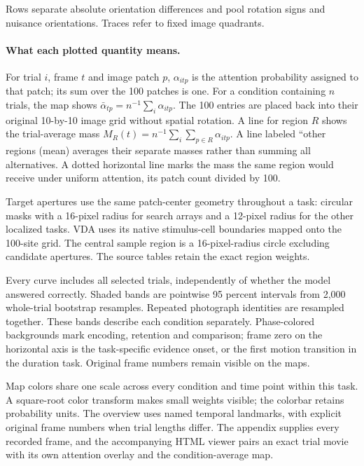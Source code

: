 \documentclass[11pt]{article}
\begin{document}
Rows separate absolute orientation differences and pool rotation signs and nuisance orientations. Traces refer to fixed image quadrants.

\paragraph{What each plotted quantity means.}
For trial $i$, frame $t$ and image patch $p$, $\alpha_{itp}$ is the attention probability assigned to that patch; its sum over the 100 patches is one. For a condition containing $n$ trials, the map shows $\bar\alpha_{tp}=n^{-1}\sum_i\alpha_{itp}$. The 100 entries are placed back into their original 10-by-10 image grid without spatial rotation. A line for region $R$ shows the trial-average mass $M_R(t)=n^{-1}\sum_i\sum_{p\in R}\alpha_{itp}$. A line labeled ``other regions (mean) averages their separate masses rather than summing all alternatives. A dotted horizontal line marks the mass the same region would receive under uniform attention, its patch count divided by 100.

Target apertures use the same patch-center geometry throughout a task: circular masks with a 16-pixel radius for search arrays and a 12-pixel radius for the other localized tasks. VDA uses its native stimulus-cell boundaries mapped onto the 100-site grid. The central sample region is a 16-pixel-radius circle excluding candidate apertures. The source tables retain the exact region weights.

Every curve includes all selected trials, independently of whether the model answered correctly. Shaded bands are pointwise 95 percent intervals from 2,000 whole-trial bootstrap resamples. Repeated photograph identities are resampled together. These bands describe each condition separately. Phase-colored backgrounds mark encoding, retention and comparison; frame zero on the horizontal axis is the task-specific evidence onset, or the first motion transition in the duration task. Original frame numbers remain visible on the maps.

Map colors share one scale across every condition and time point within this task. A square-root color transform makes small weights visible; the colorbar retains probability units. The overview uses named temporal landmarks, with explicit original frame numbers when trial lengths differ. The appendix supplies every recorded frame, and the accompanying HTML viewer pairs an exact trial movie with its own attention overlay and the condition-average map.
\end{document}

